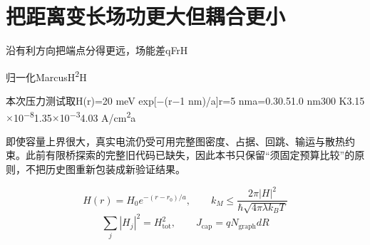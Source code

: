 \documentclass[11pt,a4paper]{article}
\begin{document}
\section{{\cjkfont 把距离变长场功更大但耦合更小}\allowbreak{}}\label{sec:30}
{\cjkfont 沿有利方向把端点分得更远，场能差}\allowbreak{}qFr\allowbreak{}H\allowbreak{}
\par
{\cjkfont 归一化}\allowbreak{}Marcus\allowbreak{}H\textsuperscript{2}\allowbreak{}H\allowbreak{}
\par
{\cjkfont 本次压力测试取}\allowbreak{}H(r)=\allowbreak{}20 meV exp[−(r−1 nm)/a]\allowbreak{}r=\allowbreak{}5 nm\allowbreak{}a=\allowbreak{}0.3\allowbreak{}0.5\allowbreak{}1.0 nm\allowbreak{}300 K\allowbreak{}3.15\ensuremath{\times}10\textsuperscript{−8}\allowbreak{}1.35\ensuremath{\times}10\textsuperscript{−3}\allowbreak{}4.03 A/cm\textsuperscript{2}\allowbreak{}a\allowbreak{}
\par
{\cjkfont 即使容量上界很大，真实电流仍受可用完整图密度、占据、回跳、输运与散热约束。此前有限桥探索的完整旧代码已缺失，因此本书只保留“须固定预算比较”的原则，不把历史图重新包装成新验证结果。}\allowbreak{}
\par
\begin{equation}
H(r)=H_0e^{-(r-r_0)/a},\qquad k_M\leq\frac{2\pi|H|^2}{\hbar\sqrt{4\pi\lambda k_BT}}
\label{eq:33}\end{equation}
\begin{equation}
\sum_j|H_j|^2=H_{\mathrm{tot}}^2,\qquad J_{\mathrm{cap}}=qN_{\mathrm{graph}}dR
\label{eq:34}\end{equation}
\end{document}
